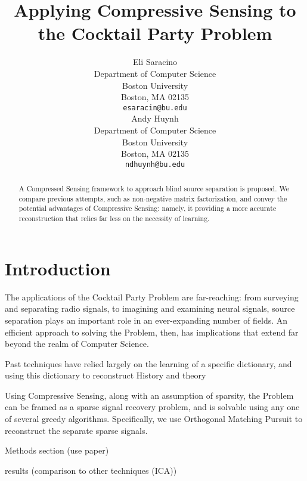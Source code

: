\documentclass{article}
\title{Applying Compressive Sensing to the Cocktail Party Problem}
\author{
  Eli Saracino \\
  Department of Computer Science\\
  Boston University\\
  Boston, MA 02135 \\
  \texttt{esaracin@bu.edu} \\
  \And
  Andy Huynh \\
  Department of Computer Science \\
  Boston University \\
  Boston, MA 02135 \\
  \texttt{ndhuynh@bu.edu} \\
}
\begin{document}
\maketitle

\begin{abstract}
  A Compressed Sensing framework to approach blind source separation is proposed. We compare previous attempts, such as non-negative matrix factorization, and convey the potential advantages of Compressive Sensing: namely, it providing a more accurate reconstruction that relies far less on the necessity of learning.
\end{abstract}

\section{Introduction}
The applications of the Cocktail Party Problem are far-reaching: from surveying and separating radio signals, to imagining and examining neural signals, source separation plays an important role in an ever-expanding number of fields. An efficient approach to solving the Problem, then, has implications that extend far beyond the realm of Computer Science. 

Past techniques have relied largely on the learning of a specific dictionary, and using this dictionary to reconstruct 
History and theory

Using Compressive Sensing, along with an assumption of sparsity, the Problem can be framed as a sparse signal recovery problem, and is solvable using any one of several greedy algorithms. Specifically, we use Orthogonal Matching Pursuit to reconstruct the separate sparse signals.


Methods section (use paper)

results (comparison to other techniques (ICA))
\end{document}
